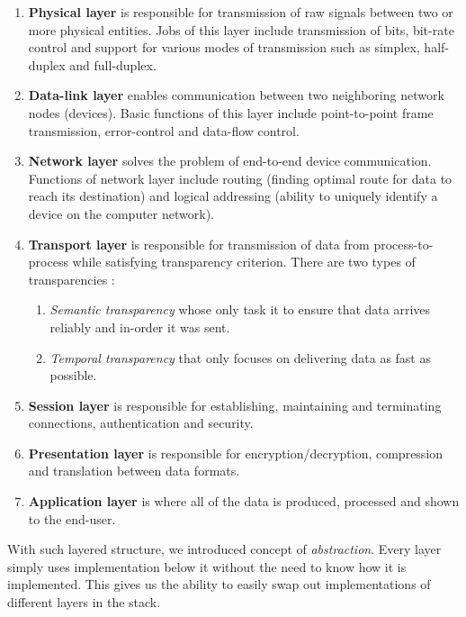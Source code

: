 \documentclass[times, utf8, diplomski]{fer}
\begin{document}
\begin{enumerate}
	\item \textbf{Physical layer} is responsible for transmission of raw signals between two or more physical entities. Jobs of this layer include transmission of bits, bit-rate control and support for various modes of transmission such as simplex, half-duplex and full-duplex.
	
	\item \textbf{Data-link layer} enables communication between two neighboring network nodes (devices). Basic functions of this layer include point-to-point frame transmission, error-control and data-flow control. 
	
	\item \textbf{Network layer} solves the problem of end-to-end device communication. Functions of network layer include routing (finding optimal route for data to reach its destination) and logical addressing (ability to uniquely identify a device on the computer network).
	
	\item \textbf{Transport layer} is responsible for transmission of data from process-to-process while satisfying transparency criterion. There are two types of transparencies \cite{kommre}:
	
	\begin{enumerate}
		\item \textit{Semantic transparency} whose only task it to ensure that data arrives reliably and in-order it was sent.
		\item \textit{Temporal transparency} that only focuses on delivering data as fast as possible.
	\end{enumerate}

	\item \textbf{Session layer} is responsible for establishing, maintaining and terminating connections, authentication and security.
	
	\item \textbf{Presentation layer} is responsible for encryption/decryption, compression and translation between data formats.
	
	\item \textbf{Application layer} is where all of the data is produced, processed and shown to the end-user. 
\end{enumerate}

With such layered structure, we introduced concept of \textit{abstraction}. Every layer simply uses implementation below it without the need to know how it is implemented. This gives us the ability to easily swap out implementations of different layers in the stack.
\end{document}
